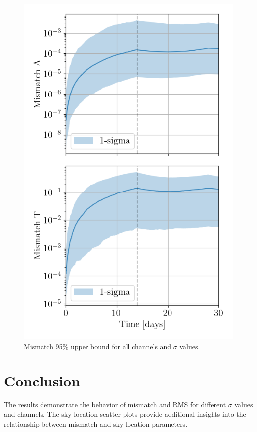 \documentclass[a4paper,12pt]{article}
\begin{document}
\begin{figure}[h!]
    \centering
    \includegraphics[width=\textwidth]{figures/mismatch_upper95_tdi_deviation_A1e-22_f0.0001_fdot1.5e-17.png}
    \caption{Mismatch 95\% upper bound for all channels and $\sigma$ values.}
    \label{fig:mismatch_upper95_1e-4}
\end{figure}


\section{Conclusion}
The results demonstrate the behavior of mismatch and RMS for different $\sigma$ values and channels. The sky location scatter plots provide additional insights into the relationship between mismatch and sky location parameters.
\end{document}

